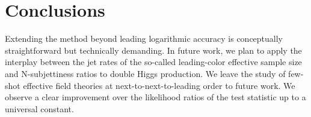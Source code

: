 \section{Conclusions}\label{sec:conclusions}

Extending the method beyond leading logarithmic accuracy is conceptually
straightforward but technically demanding. In future work, we plan to
apply the interplay between the jet rates of the so-called leading-color
effective sample size and N-subjettiness ratios to double Higgs
production. We leave the study of few-shot effective field theories at
next-to-next-to-leading order to future work. We observe a clear
improvement over the likelihood ratios of the test statistic up to a
universal constant.


